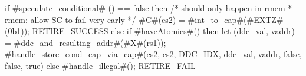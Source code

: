 if #\hyperref[sailRISCVzspeculatezyconditional]{speculate\_conditional}# () == false then {
  /* should only happen in rmem
   * rmem: allow SC to fail very early
   */
  #\hyperref[sailRISCVzC]{C}#(cs2) = #\hyperref[sailRISCVzintzytozycap]{int\_to\_cap}#(#\hyperref[sailRISCVzEXTZ]{EXTZ}#(0b1));
  RETIRE_SUCCESS
} else if #\hyperref[sailRISCVzhaveAtomics]{haveAtomics}#() then {
  let (ddc_val, vaddr) = #\hyperref[sailRISCVzddczyandzyresultingzyaddr]{ddc\_and\_resulting\_addr}#(#\hyperref[sailRISCVzX]{X}#(rs1));
  #\hyperref[sailRISCVzhandlezystorezycondzycapzyviazycap]{handle\_store\_cond\_cap\_via\_cap}#(cs2, cs2, DDC_IDX, ddc_val, vaddr, false, false, true)
} else {
  #\hyperref[sailRISCVzhandlezyillegal]{handle\_illegal}#();
  RETIRE_FAIL
}
